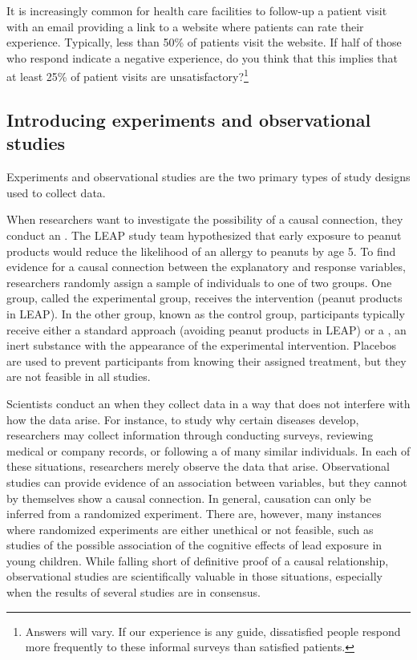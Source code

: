 \newpage

\begin{exercise}
It is increasingly common for health care facilities to follow-up a patient visit with an email providing a link to a website where patients can rate their experience.  Typically, less than 50\% of patients visit the website.  If half of those who respond indicate a negative experience, do you think that this implies that at least 25\% of patient visits are unsatisfactory?\footnote{Answers will vary. If our experience is any guide, dissatisfied people respond more frequently to these informal surveys than satisfied patients.}
\end{exercise}


\subsection{Introducing experiments and observational studies}

Experiments and observational studies are the two primary types of study designs used to collect data.

When researchers want to investigate the possibility of a causal connection, they conduct an . The LEAP study team hypothesized that early exposure to peanut products would reduce the likelihood of an allergy to peanuts by age 5. To find evidence for a causal connection between the explanatory and response variables, researchers randomly assign a sample of individuals to one of two groups.  One group, called the experimental group, receives the intervention (peanut products in LEAP). In the other group, known as the control group, participants typically receive either a standard approach (avoiding peanut products in LEAP) or a , an inert substance with the appearance of the experimental intervention.  Placebos are used to prevent participants from knowing their assigned treatment, but they are not feasible in all studies.

Scientists conduct an  when they collect data in a way that does not interfere with how the data arise. For instance, to study why certain diseases develop, researchers may collect information through conducting surveys, reviewing medical or company records, or following a  of many similar individuals. In each of these situations, researchers merely observe the data that arise. Observational studies can provide evidence of an association between variables, but they cannot by themselves show a causal connection. In general, causation can only be inferred from a randomized experiment.  There are, however, many instances where randomized experiments are either unethical or not feasible, such as studies of the possible association of the cognitive effects of lead exposure in young children.  While falling short of definitive proof of a causal relationship, observational studies are scientifically valuable in those situations, especially when the results of several studies are in consensus.

